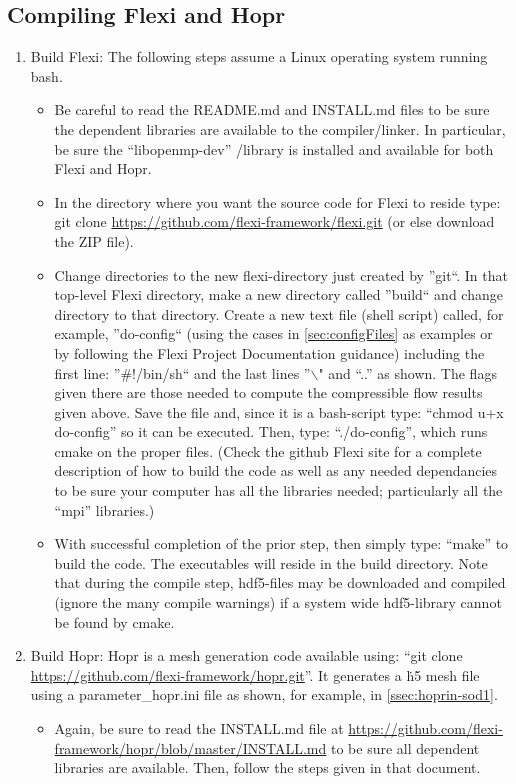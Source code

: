 
\begin{appendices}

\renewcommand\thefigure{\thesection.\arabic{figure}}

\appendix
\section{Compiling Flexi and Hopr}\label{Asec:compile}

\begin{enumerate}
 \item Build Flexi: The following steps assume a Linux operating system running bash.
 \begin{itemize}
 \item Be careful to read the README.md and INSTALL.md files to be sure the dependent libraries are available to the compiler/linker.  In particular, be sure the ``libopenmp-dev'' /library is installed and available for both Flexi and Hopr.
  \item In the directory where you want the source code for Flexi to reside type: git clone \url{https://github.com/flexi-framework/flexi.git} (or else download the ZIP file).
  \item Change directories to the new flexi-directory just created by ''git``. In that top-level Flexi directory, make a new directory called ''build`` and change directory to that directory. Create a new text file (shell script) called, for example, ''do-config`` (using the cases in \ref{sec:configFiles} as examples or by following the Flexi Project Documentation guidance) including the first line: ''\#!/bin/sh`` and the last lines ''$\backslash$" and ``..'' as shown. The flags given there are those needed to compute the compressible flow results given above. Save the file and, since it is a bash-script type: ``chmod u+x do-config'' so it can be executed.  Then, type: ``./do-config'', which runs cmake on the proper files.  (Check the github Flexi site for a complete description of how to build the code as well as any needed dependancies to be sure your computer has all the libraries needed; particularly all the ``mpi'' libraries.)
  \item With successful completion of the prior step, then simply type: ``make'' to build the code.  The executables will reside in the build directory. Note that during the compile step, hdf5-files may be downloaded and compiled (ignore the many compile warnings) if a system wide hdf5-library cannot be found by cmake.
 \end{itemize}
\item Build Hopr: Hopr is a mesh generation code available using: ``git clone \url{https://github.com/flexi-framework/hopr.git}''.  It generates a \.h5 mesh file using a parameter\_hopr.ini file as shown, for example, in \ref{ssec:hoprin-sod1}.
\begin{itemize}
 \item Again, be sure to read the INSTALL.md file at \url{https://github.com/flexi-framework/hopr/blob/master/INSTALL.md} to be sure all dependent libraries are available.  Then, follow the steps given in that document.
\end{itemize}
\end{enumerate}


\end{appendices}

